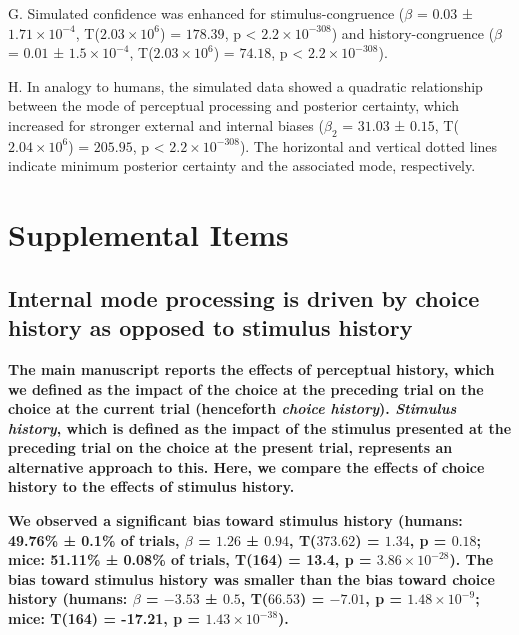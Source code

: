 \documentclass[
]{article}
\begin{document}
G. Simulated confidence was enhanced for stimulus-congruence (\(\beta\)
= \(0.03\) ± \(\ensuremath{1.71\times 10^{-4}}\),
T(\(\ensuremath{2.03\times 10^{6}}\)) = \(178.39\), p < \(\ensuremath{2.2\times 10^{-308}}\)) and
history-congruence (\(\beta\) = \(0.01\) ±
\(\ensuremath{1.5\times 10^{-4}}\),
T(\(\ensuremath{2.03\times 10^{6}}\)) = \(74.18\), p < \(\ensuremath{2.2\times 10^{-308}}\)).

H. In analogy to humans, the simulated data showed a quadratic
relationship between the mode of perceptual processing and posterior
certainty, which increased for stronger external and internal biases
(\(\beta_2\) = \(31.03\) ± \(0.15\),
T(\(\ensuremath{2.04\times 10^{6}}\)) = \(205.95\), p < \(\ensuremath{2.2\times 10^{-308}}\)). The
horizontal and vertical dotted lines indicate minimum posterior
certainty and the associated mode, respectively.

\hypertarget{supplemental-items}{%
\section{Supplemental Items}\label{supplemental-items}}

\hypertarget{internal-mode-processing-is-driven-by-choice-history-as-opposed-to-stimulus-history}{%
\subsection{Internal mode processing is driven by choice history as
opposed to stimulus
history}\label{internal-mode-processing-is-driven-by-choice-history-as-opposed-to-stimulus-history}}

\textbf{The main manuscript reports the effects of perceptual history,
which we defined as the impact of the choice at the preceding trial on
the choice at the current trial (henceforth \emph{choice history}).
\emph{Stimulus history}, which is defined as the impact of the stimulus
presented at the preceding trial on the choice at the present trial,
represents an alternative approach to this. Here, we compare the effects
of choice history to the effects of stimulus history.}

\textbf{We observed a significant bias toward stimulus history (humans:
49.76\% ± 0.1\% of trials, \(\beta\) = \(1.26\) ± \(0.94\),
T(\(373.62\)) = \(1.34\), p = \(0.18\); mice: 51.11\% ± 0.08\% of
trials, T(164) = 13.4, p = \(\ensuremath{3.86\times 10^{-28}}\)). The
bias toward stimulus history was smaller than the bias toward choice
history (humans: \(\beta\) = \(-3.53\) ± \(0.5\), T(\(66.53\)) =
\(-7.01\), p = \(\ensuremath{1.48\times 10^{-9}}\); mice: T(164) =
-17.21, p = \(\ensuremath{1.43\times 10^{-38}}\)).}
\end{document}
